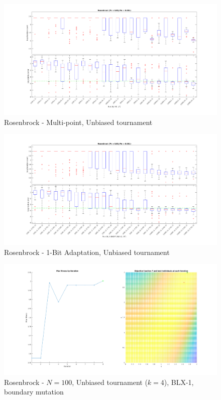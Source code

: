 \documentclass[12pt, letterpaper]{article}
\begin{document}
\begin{figure}
  \includegraphics[width=\linewidth]{img/r_mp_ut.png}
  \centering
  \captionsetup{justification=centering}
  \caption{Rosenbrock - Multi-point, Unbiased tournament}
  \label{fig:r_mp_ut}
\end{figure}

\begin{figure}
  \includegraphics[width=\linewidth]{img/r_1b_ut.png}
  \centering
  \captionsetup{justification=centering}
  \caption{Rosenbrock - 1-Bit Adaptation, Unbiased tournament}
  \label{fig:r_1b_ut}
\end{figure}

\begin{figure}
  \includegraphics[width=\linewidth]{img/r_quick.png}
  \centering
  \captionsetup{justification=centering}
  \caption{Rosenbrock - $N = 100$, Unbiased tournament ($k = 4$), BLX-1, boundary mutation}
  \label{fig:r_quick}
\end{figure}
\end{document}
